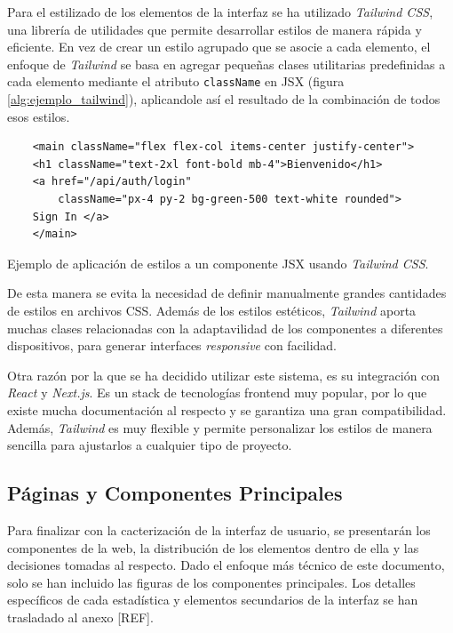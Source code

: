 Para el estilizado de los elementos de la interfaz se ha utilizado \textit{Tailwind CSS}, una librería de utilidades que permite desarrollar estilos de manera rápida y eficiente. En vez de crear un estilo agrupado que se asocie a cada elemento, el enfoque de \textit{Tailwind} se basa en agregar pequeñas clases utilitarias predefinidas a cada elemento mediante el atributo \texttt{className} en JSX (figura \ref{alg:ejemplo_tailwind}), aplicandole así el resultado de la combinación de todos esos estilos.

\setlength{\intextsep}{15pt} %
\setlength{\abovecaptionskip}{0pt} %
\setlength{\belowcaptionskip}{0pt} %

\begin{ifalgorithm}[H]
    \begin{lstlisting}
    <main className="flex flex-col items-center justify-center">
    <h1 className="text-2xl font-bold mb-4">Bienvenido</h1>
    <a href="/api/auth/login"
        className="px-4 py-2 bg-green-500 text-white rounded">
    Sign In </a>
    </main>
    \end{lstlisting}
    \caption{Ejemplo de aplicación de estilos a un componente JSX usando \textit{Tailwind CSS}.}
    \label{alg:ejemplo_tailwind}
\end{ifalgorithm}

De esta manera se evita la necesidad de definir manualmente grandes cantidades de estilos en archivos CSS. Además de los estilos estéticos, \textit{Tailwind} aporta muchas clases relacionadas con la adaptavilidad de los componentes a diferentes dispositivos, para generar interfaces \textit{responsive} con facilidad.

Otra razón por la que se ha decidido utilizar este sistema, es su integración con \textit{React} y \textit{Next.js}. Es un stack de tecnologías frontend muy popular, por lo que existe mucha documentación al respecto y se garantiza una gran compatibilidad. Además, \textit{Tailwind} es muy flexible y permite personalizar los estilos de manera sencilla para ajustarlos a cualquier tipo de proyecto.

\subsection{Páginas y Componentes Principales}

Para finalizar con la cacterización de la interfaz de usuario, se presentarán los componentes de la web, la distribución de los elementos dentro de ella y las decisiones tomadas al respecto. Dado el enfoque más técnico de este documento, solo se han incluido las figuras de los componentes principales. Los detalles específicos de cada estadística y elementos secundarios de la interfaz se han trasladado al anexo [REF].

